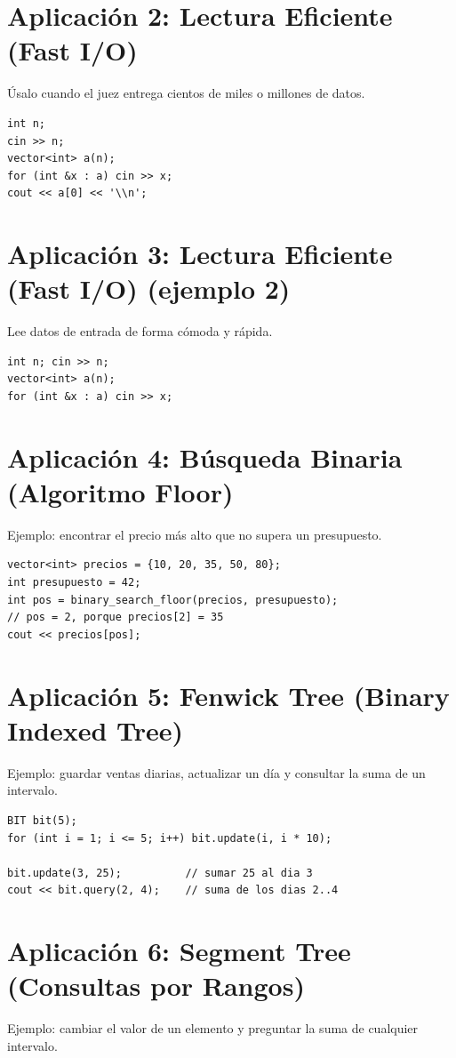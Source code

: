 \documentclass[10pt,twocolumn,letterpaper]{report}
\begin{document}
\section{Aplicación 2: Lectura Eficiente (Fast I/O)}
Úsalo cuando el juez entrega cientos de miles o millones de datos.

\begin{lstlisting}
int n;
cin >> n;
vector<int> a(n);
for (int &x : a) cin >> x;
cout << a[0] << '\\n';
\end{lstlisting}

\section{Aplicación 3: Lectura Eficiente (Fast I/O) (ejemplo 2)}
Lee datos de entrada de forma cómoda y rápida.

\begin{lstlisting}
int n; cin >> n;
vector<int> a(n);
for (int &x : a) cin >> x;
\end{lstlisting}

\section{Aplicación 4: Búsqueda Binaria (Algoritmo Floor)}
Ejemplo: encontrar el precio más alto que no supera un presupuesto.

\begin{lstlisting}
vector<int> precios = {10, 20, 35, 50, 80};
int presupuesto = 42;
int pos = binary_search_floor(precios, presupuesto);
// pos = 2, porque precios[2] = 35
cout << precios[pos];
\end{lstlisting}

\section{Aplicación 5: Fenwick Tree (Binary Indexed Tree)}
Ejemplo: guardar ventas diarias, actualizar un día y consultar la suma de un intervalo.

\begin{lstlisting}
BIT bit(5);
for (int i = 1; i <= 5; i++) bit.update(i, i * 10);

bit.update(3, 25);          // sumar 25 al dia 3
cout << bit.query(2, 4);    // suma de los dias 2..4
\end{lstlisting}

\section{Aplicación 6: Segment Tree (Consultas por Rangos)}
Ejemplo: cambiar el valor de un elemento y preguntar la suma de cualquier intervalo.
\end{document}
